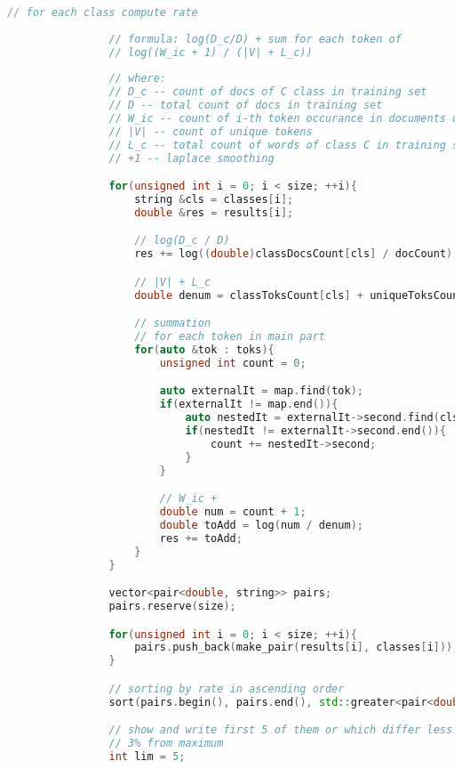\documentclass[12pt,a4paper]{scrartcl}
\begin{document}
\begin{lstlisting}[language=C++, basicstyle=\scriptsize]
                // for each class compute rate
                
                // formula: log(D_c/D) + sum for each token of 
                // log((W_ic + 1) / (|V| + L_c))
                
                // where: 
                // D_c -- count of docs of C class in training set
                // D -- total count of docs in training set
                // W_ic -- count of i-th token occurance in documents of class C 
                // |V| -- count of unique tokens
                // L_c -- total count of words of class C in training set
                // +1 -- laplace smoothing

                for(unsigned int i = 0; i < size; ++i){
                    string &cls = classes[i];
                    double &res = results[i];

                    // log(D_c / D)
                    res += log((double)classDocsCount[cls] / docCount);

                    // |V| + L_c
                    double denum = classToksCount[cls] + uniqueToksCount;

                    // summation
                    // for each token in main part
                    for(auto &tok : toks){
                        unsigned int count = 0;

                        auto externalIt = map.find(tok);
                        if(externalIt != map.end()){
                            auto nestedIt = externalIt->second.find(cls);
                            if(nestedIt != externalIt->second.end()){
                                count += nestedIt->second;
                            }
                        }

                        // W_ic + 
                        double num = count + 1;
                        double toAdd = log(num / denum);
                        res += toAdd;
                    }
                }

                vector<pair<double, string>> pairs;
                pairs.reserve(size);

                for(unsigned int i = 0; i < size; ++i){
                    pairs.push_back(make_pair(results[i], classes[i]));
                }

                // sorting by rate in ascending order
                sort(pairs.begin(), pairs.end(), std::greater<pair<double, string>>());

                // show and write first 5 of them or which differ less than 
                // 3% from maximum 
                int lim = 5;


\end{lstlisting}
\end{document}
